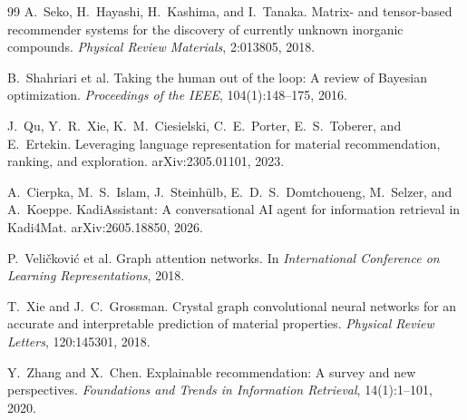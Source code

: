 \documentclass[12pt,a4paper]{article}
\begin{document}
\begin{thebibliography}{99}
 A.~Seko, H.~Hayashi, H.~Kashima, and I.~Tanaka. Matrix- and tensor-based recommender systems for the discovery of currently unknown inorganic compounds. \textit{Physical Review Materials}, 2:013805, 2018.

 B.~Shahriari et al. Taking the human out of the loop: A review of Bayesian optimization. \textit{Proceedings of the IEEE}, 104(1):148--175, 2016.

 J.~Qu, Y.~R.~Xie, K.~M.~Ciesielski, C.~E.~Porter, E.~S.~Toberer, and E.~Ertekin. Leveraging language representation for material recommendation, ranking, and exploration. arXiv:2305.01101, 2023.

 A.~Cierpka, M.~S.~Islam, J.~Steinh\"{u}lb, E.~D.~S.~Domtchoueng, M.~Selzer, and A.~Koeppe. KadiAssistant: A conversational AI agent for information retrieval in Kadi4Mat. arXiv:2605.18850, 2026.

 P.~Veli\v{c}kovi\'{c} et al. Graph attention networks. In \textit{International Conference on Learning Representations}, 2018.

 T.~Xie and J.~C.~Grossman. Crystal graph convolutional neural networks for an accurate and interpretable prediction of material properties. \textit{Physical Review Letters}, 120:145301, 2018.

 Y.~Zhang and X.~Chen. Explainable recommendation: A survey and new perspectives. \textit{Foundations and Trends in Information Retrieval}, 14(1):1--101, 2020.

\end{thebibliography}
\end{document}
